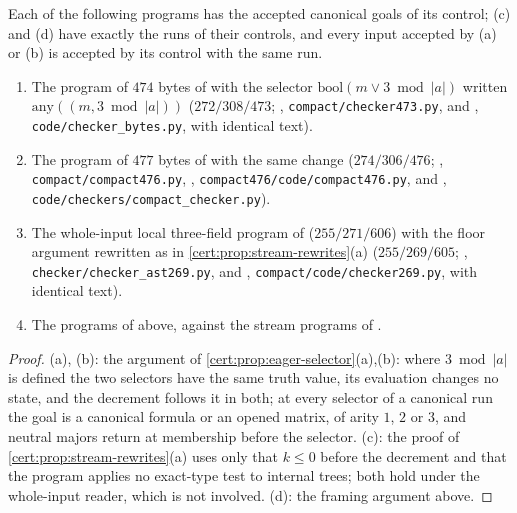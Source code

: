 \begin{proposition}[Compositions]\label{cert:prop:leaf-compositions}
Each of the following programs has the accepted canonical goals of its
control; (c) and (d) have exactly the runs of their controls, and every input
accepted by (a) or (b) is accepted by its control with the same run.
\begin{enumerate}[label=(\alph*)]
\item The program of $474$ bytes of  with the
selector $\mathrm{bool}(m\lor 3\bmod\lvert a\rvert)$ written
$\mathrm{any}((m,3\bmod\lvert a\rvert))$ ($272/308/473$;
, \texttt{compact/checker473.py}, and
, \texttt{code/checker\_bytes.py}, with identical
text).
\item The program of $477$ bytes of  with the same change
($274/306/476$; , \texttt{compact/compact476.py},
, \texttt{compact476/code/compact476.py}, and
, \texttt{code/checkers/compact\_checker.py}).
\item The whole-input local three-field program of 
($255/271/606$) with the floor argument rewritten as in
\cref{cert:prop:stream-rewrites}(a) ($255/269/605$;
, \texttt{checker/checker\_ast269.py}, and
, \texttt{compact/code/checker269.py}, with
identical text).
\item The programs of  above, against the stream
programs of .
\end{enumerate}
\end{proposition}
\begin{proof}
(a), (b): the argument of \cref{cert:prop:eager-selector}(a),(b): where
$3\bmod\lvert a\rvert$ is defined the two selectors have the same truth value,
its evaluation changes no state, and the decrement follows it in both; at every
selector of a canonical run the goal is a canonical formula or an opened matrix,
of arity $1$, $2$ or $3$, and neutral majors return at membership before the
selector. (c): the proof of \cref{cert:prop:stream-rewrites}(a) uses only that
$k\le 0$ before the decrement and that the program applies no exact-type test to
internal trees; both hold under the whole-input reader, which is not involved.
(d): the framing argument above.
\end{proof}

